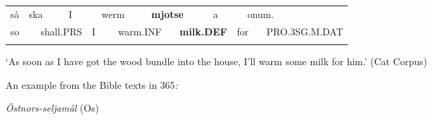 \begin{tabular}{llllllllllllll}
\lsptoprule
så & \multicolumn{2}{l}{ska

} & \multicolumn{2}{l}{I

} & \multicolumn{2}{l}{werm

} & \multicolumn{2}{l}{{\bfseries mjotse}

} & \multicolumn{2}{l}{a

} & \multicolumn{2}{l}{onum.

} & \\
\multicolumn{2}{l}{so

} & \multicolumn{2}{l}{shall.PRS

} & \multicolumn{2}{l}{I

} & \multicolumn{2}{l}{warm.INF

} & \multicolumn{2}{l}{{\bfseries milk.DEF}

} & \multicolumn{2}{l}{for

} & \multicolumn{2}{l}{PRO.3SG.M.DAT

}\\
\lspbottomrule
\end{tabular}

\begin{styleTranslation}
‘As soon as I have got the wood bundle into the house, I’ll warm some milk for him.’ (Cat Corpus)

\end{styleTranslation}

\begin{styleBodyTextFirst}
An example from the Bible texts in 365\textit{:}

\end{styleBodyTextFirst}

\begin{listWWNumileveli}
\item 

\begin{styleExample}
\label{bkm:Ref123968060}\textit{Östnors-seljamål} (Os)

\end{styleExample}

\end{listWWNumileveli}

